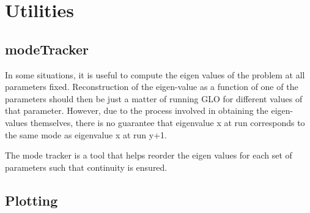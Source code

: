 \documentclass[a4paper,10pt]{book}
\begin{document}
\appendix

\chapter{Utilities}
\section{modeTracker}
\label{util:modeTracker}
In some situations, it is useful to compute the eigen values of the problem at
all parameters fixed. Reconstruction of the eigen-value as a function of one of
the parameters should then be just a matter of running GLO for different values
of that parameter. However, due to the process involved in obtaining the
eigen-values themselves, there is no guarantee that eigenvalue x at run
corresponds to the same mode as eigenvalue x at run y+1.

The mode tracker is a tool that helps reorder the eigen values for each set of
parameters such that continuity is ensured.

\section{Plotting}
\subsection{}


\end{document}
